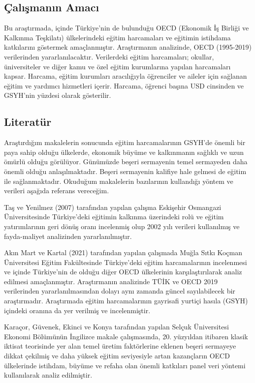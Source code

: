 \documentclass[
  12pt,
]{article}
\begin{document}
\hypertarget{uxe7alux131ux15fmanux131n-amacux131}{%
\subsection{Çalışmanın Amacı}\label{uxe7alux131ux15fmanux131n-amacux131}}

Bu araştırmada, içinde Türkiye'nin de bulunduğu OECD (Ekonomik İş Birliği ve Kalkınma Teşkilatı) ülkelerindeki eğitim harcamaları ve eğitimin istihdama katkılarını göstermek amaçlanmıştır. Araştırmanın analizinde, OECD (1995-2019) verilerinden yararlanılacaktır. Verilerdeki eğitim harcamaları; okullar, üniversiteler ve diğer kamu ve özel eğitim kurumlarına yapılan harcamaları kapsar. Harcama, eğitim kurumları aracılığıyla öğrenciler ve aileler için sağlanan eğitim ve yardımcı hizmetleri içerir. Harcama, öğrenci başına USD cinsinden ve GSYH'nin yüzdesi olarak gösterilir.

\hypertarget{literatuxfcr}{%
\subsection{Literatür}\label{literatuxfcr}}

Araştırdığım makalelerin sonucunda eğitim harcamalarının GSYH'de önemli bir paya sahip olduğu ülkelerde, ekonomik büyüme ve kalkınmanın sağlıklı ve uzun ömürlü olduğu görülüyor. Günümüzde beşeri sermayenin temel sermayeden daha önemli olduğu anlaşılmaktadır. Beşeri sermayenin kalifiye hale gelmesi de eğitim ile sağlanmaktadır. Okuduğum makalelerin bazılarının kullandığı yöntem ve verileri aşağıda referans vereceğim.

Taş ve Yenilmez (2007) tarafından yapılan çalışma Eskişehir Osmangazi Üniversitesinde Türkiye'deki eğitimin kalkınma üzerindeki rolü ve eğitim yatırımlarının geri dönüş oranı incelenmiş olup 2002 yılı verileri kullanılmış ve fayda-maliyet analizinden yararlanılmıştır.

Akın Mart ve Kartal (2021) tarafından yapılan çalışmada Muğla Sıtkı Koçman Üniversitesi Eğitim Fakültesinde Türkiye'deki eğitim harcamalarının incelenmesi ve içinde Türkiye'nin de olduğu diğer OECD ülkelerinin karşılaştırılarak analiz edilmesi amaçlanmıştır. Araştırmanın analizinde TÜİK ve OECD 2019 verilerinden yararlanılmasından dolayı aynı zamanda güncel sayılabilecek bir araştırmadır. Araştırmada eğitim harcamalarının gayrisafi yurtiçi hasıla (GSYH) içindeki oranına da yer verilmiş ve incelenmiştir.

Karaçor, Güvenek, Ekinci ve Konya tarafından yapılan Selçuk Üniversitesi Ekonomi Bölümünün İngilizce makale çalışmasında, 20. yüzyıldan itibaren klasik iktisat teorisinde yer alan temel üretim faktörlerine eklenen beşeri sermayeye dikkat çekilmiş ve daha yüksek eğitim seviyesiyle artan kazançların OECD ülkelerinde istihdam, büyüme ve refaha olan önemli katkıları panel veri yöntemi kullanılarak analiz edilmiştir.
\end{document}
